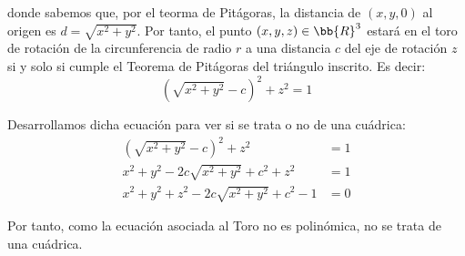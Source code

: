 \begin{ejercicio}
\begin{figure}[H]
        \end{figure}
        donde sabemos que, por el teorma de Pitágoras, la distancia de $(x,y,0)$ al origen es $d=\sqrt{x^2+y^2}$. Por tanto, el punto $(x,y,z)\in \bb{R}^3$ estará en el toro de rotación de la circunferencia de radio $r$ a una distancia $c$ del eje de rotación $z$ si y solo si cumple el Teorema de Pitágoras del triángulo inscrito. Es decir:
        \begin{equation*}
            \left(\sqrt{x^2+y^2}-c\right)^2 + z^2= 1
        \end{equation*}

        Desarrollamos dicha ecuación para ver si se trata o no de una cuádrica:
        \begin{equation*}
            \begin{split}
                \left(\sqrt{x^2+y^2}-c\right)^2 + z^2&= 1\\
                x^2+y^2-2c\sqrt{x^2+y^2}+c^2+z^2&= 1\\
                x^2+y^2+z^2-2c\sqrt{x^2+y^2}+c^2-1&= 0
            \end{split}
        \end{equation*}

        Por tanto, como la ecuación asociada al Toro no es polinómica, no se trata de una cuádrica.
\end{ejercicio}


